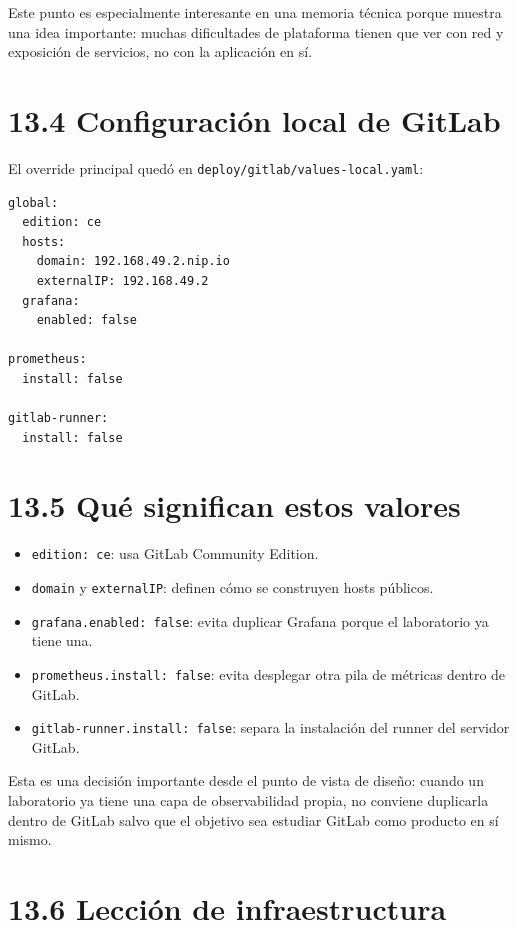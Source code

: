 \documentclass[
a4paper,
12pt]{report}
\providecommand{\tightlist}{%
  \setlength{\itemsep}{0pt}\setlength{\parskip}{0pt}}
\begin{document}
Este punto es especialmente interesante en una memoria técnica porque
muestra una idea importante: muchas dificultades de plataforma tienen
que ver con red y exposición de servicios, no con la aplicación en sí.

\section{13.4 Configuración local de
GitLab}\label{configuraciuxf3n-local-de-gitlab}

El override principal quedó en \texttt{deploy/gitlab/values-local.yaml}:

\begin{verbatim}
global:
  edition: ce
  hosts:
    domain: 192.168.49.2.nip.io
    externalIP: 192.168.49.2
  grafana:
    enabled: false

prometheus:
  install: false

gitlab-runner:
  install: false
\end{verbatim}

\section{13.5 Qué significan estos
valores}\label{quuxe9-significan-estos-valores}

\begin{itemize}
\tightlist
\item
  \texttt{edition:\ ce}: usa GitLab Community Edition.
\item
  \texttt{domain} y \texttt{externalIP}: definen cómo se construyen
  hosts públicos.
\item
  \texttt{grafana.enabled:\ false}: evita duplicar Grafana porque el
  laboratorio ya tiene una.
\item
  \texttt{prometheus.install:\ false}: evita desplegar otra pila de
  métricas dentro de GitLab.
\item
  \texttt{gitlab-runner.install:\ false}: separa la instalación del
  runner del servidor GitLab.
\end{itemize}

Esta es una decisión importante desde el punto de vista de diseño:
cuando un laboratorio ya tiene una capa de observabilidad propia, no
conviene duplicarla dentro de GitLab salvo que el objetivo sea estudiar
GitLab como producto en sí mismo.

\section{13.6 Lección de
infraestructura}\label{lecciuxf3n-de-infraestructura}
\end{document}
